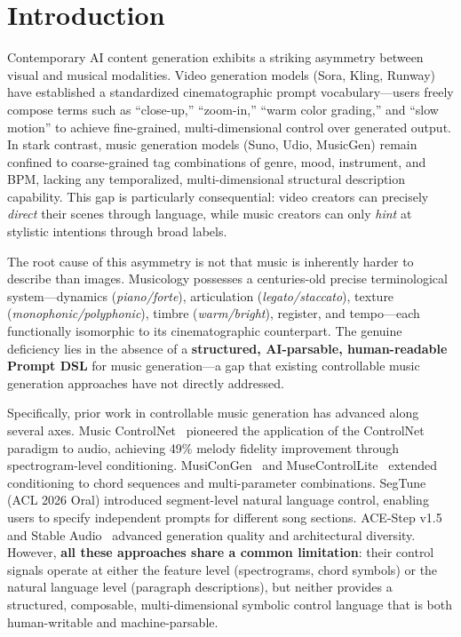 \documentclass[11pt,twocolumn]{article}
\begin{document}
\section{Introduction}

Contemporary AI content generation exhibits a striking asymmetry between visual and musical modalities. Video generation models (Sora, Kling, Runway) have established a standardized cinematographic prompt vocabulary---users freely compose terms such as ``close-up,'' ``zoom-in,'' ``warm color grading,'' and ``slow motion'' to achieve fine-grained, multi-dimensional control over generated output. In stark contrast, music generation models (Suno, Udio, MusicGen) remain confined to coarse-grained tag combinations of genre, mood, instrument, and BPM, lacking any temporalized, multi-dimensional structural description capability. This gap is particularly consequential: video creators can precisely \textit{direct} their scenes through language, while music creators can only \textit{hint} at stylistic intentions through broad labels.

The root cause of this asymmetry is not that music is inherently harder to describe than images. Musicology possesses a centuries-old precise terminological system---dynamics (\textit{piano/forte}), articulation (\textit{legato/staccato}), texture (\textit{monophonic/polyphonic}), timbre (\textit{warm/bright}), register, and tempo---each functionally isomorphic to its cinematographic counterpart. The genuine deficiency lies in the absence of a \textbf{structured, AI-parsable, human-readable Prompt DSL} for music generation---a gap that existing controllable music generation approaches have not directly addressed.

Specifically, prior work in controllable music generation has advanced along several axes. Music ControlNet~\cite{musiccontrolnet} pioneered the application of the ControlNet paradigm to audio, achieving 49\% melody fidelity improvement through spectrogram-level conditioning. MusiConGen~\cite{musecong} and MuseControlLite~\cite{muselite} extended conditioning to chord sequences and multi-parameter combinations. SegTune~\cite{segtune} (ACL 2026 Oral) introduced segment-level natural language control, enabling users to specify independent prompts for different song sections. ACE-Step v1.5~\cite{acestep} and Stable Audio~\cite{stableaudio} advanced generation quality and architectural diversity. However, \textbf{all these approaches share a common limitation}: their control signals operate at either the feature level (spectrograms, chord symbols) or the natural language level (paragraph descriptions), but neither provides a structured, composable, multi-dimensional symbolic control language that is both human-writable and machine-parsable.
\end{document}
